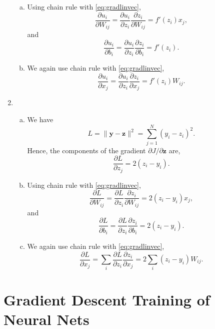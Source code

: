 \documentclass[11pt]{article}
\newcommand{\ybf}{\mathbf{y}}
\newcommand{\zbf}{\mathbf{z}}
\begin{document}
\begin{enumerate}
\begin{enumerate}[(a)]
\item Using chain rule with \eqref{eq:gradlinvec},
\[
    \frac{\partial u_i}{\partial W_{ij}} = \frac{\partial u_i}{\partial z_i}\frac{\partial z_i}{\partial W_{ij}} = f'(z_i)x_j,
\]
and
\[
    \frac{\partial u_i}{\partial b_i} = \frac{\partial u_i}{\partial z_i}\frac{\partial z_i}{\partial b_i} = f'(z_i).
\]


\item We again use chain rule with \eqref{eq:gradlinvec},
\[
    \frac{\partial u_i}{\partial x_j} = \frac{\partial u_i}{\partial z_i}\frac{\partial z_i}{\partial x_j} = f'(z_i)W_{ij}.
\]
\end{enumerate}

\item
\begin{enumerate}[(a)]
\item We have
\[
    L = \|\ybf-\zbf\|^2 = \sum_{j=1}^N (y_i-z_i)^2.
\]
Hence, the components of the gradient $\partial J/\partial \zbf$ are,
\[
    \frac{\partial L}{\partial z_j} = 2(z_i-y_i).
\]

\item Using chain rule with \eqref{eq:gradlinvec},
\[
    \frac{\partial L}{\partial W_{ij}} = \frac{\partial L}{\partial z_i}\frac{\partial z_i}{\partial W_{ij}} = 2(z_i-y_i)x_j,
\]
and
\[
    \frac{\partial L}{\partial b_i} = \frac{\partial L}{\partial z_i}\frac{\partial z_i}{\partial b_i} = 2(z_i-y_i).
\]


\item We again use chain rule with \eqref{eq:gradlinvec},
\[
    \frac{\partial L}{\partial x_j} = \sum_i 
    \frac{\partial L}{\partial z_i}\frac{\partial z_i}{\partial x_j} = 
    2  \sum_i (z_i-y_i)W_{ij}.
\]
\end{enumerate}
\end{enumerate}

\section{Gradient Descent Training of Neural Nets}
\end{document}
